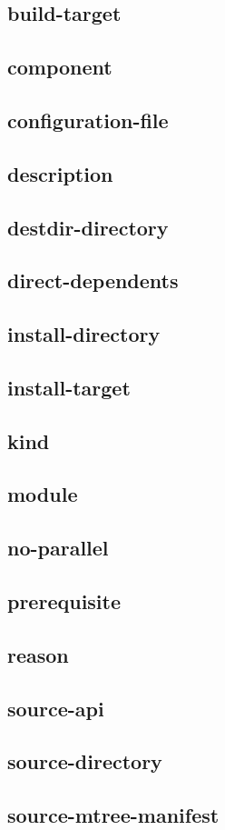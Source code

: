\subsection{build-target}
\subsection{component}
\subsection{configuration-file}
\subsection{description}
\subsection{destdir-directory}
\subsection{direct-dependents}
\subsection{install-directory}
\subsection{install-target}
\subsection{kind}
\subsection{module}
\subsection{no-parallel}
\subsection{prerequisite}
\subsection{reason}
\subsection{source-api}
\subsection{source-directory}
\subsection{source-mtree-manifest}

